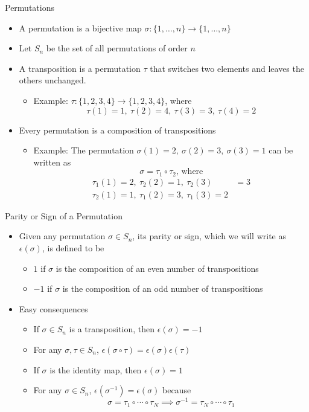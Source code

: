 \documentclass[usenames,dvipsnames,10pt]{beamer}
\begin{document}
\begin{frame}
  {Permutations}

  \begin{itemize}
  \item A permutation is a bijective map $\sigma: \{1, \dots, n\} \rightarrow \{1, \dots, n\}$
  \item Let $S_n$ be the set of all permutations of order $n$
  \item A transposition is a permutation $\tau$ that switches two elements and leaves the others unchanged.
    \begin{itemize}
    \item Example: $\tau: \{1, 2, 3, 4\} \rightarrow \{1, 2, 3, 4\}$, where
      \[
        \tau(1) = 1,\ \tau(2) = 4,\ \tau(3) = 3,\ \tau(4)=2
      \]
    \end{itemize}
  \item Every permutation is a composition of transpositions
    \begin{itemize}
    \item Example: The permutation $\sigma(1)=2,\ \sigma(2)=3,\ \sigma(3)=1$ can be written as
      \[
        \sigma = \tau_1\circ\tau_2\text{, where}
      \]
      \begin{align*}
        \tau_1(1)=2,\ \tau_2(2)=1,\ \tau_2(3) &= 3\\
        \tau_2(1)=1,\ \tau_1(2)=3,\ \tau_1(3)=2
      \end{align*}
    \end{itemize}
  \end{itemize}
\end{frame}

\begin{frame}
  {Parity or Sign of a Permutation}

  \begin{itemize}
  \item Given any permutation $\sigma \in S_n$, its parity or sign, which we will write as $\epsilon(\sigma)$, is defined to be
    \begin{itemize}
    \item $1$ if $\sigma$ is the composition of an even number of transpositions
    \item $-1$ if $\sigma$  is the composition of an odd number of transpositions
    \end{itemize}
  \item Easy consequences
    \begin{itemize}
    \item If $\sigma \in S_n$ is a transposition, then $\epsilon(\sigma) = -1$
    \item For any $\sigma, \tau \in S_n$, $\epsilon(\sigma\circ\tau) = \epsilon(\sigma)\epsilon(\tau)$
    \item If $\sigma$ is the identity map, then $\epsilon(\sigma) = 1$
    \item For any $\sigma \in S_n$, $\epsilon(\sigma^{-1}) = \epsilon(\sigma)$ because
      \[
        \sigma = \tau_1\circ\cdots \circ \tau_N \implies \sigma^{-1} = \tau_N\circ\cdots \circ \tau_1
      \]
    \end{itemize}
  \end{itemize}
\end{frame}
\end{document}
